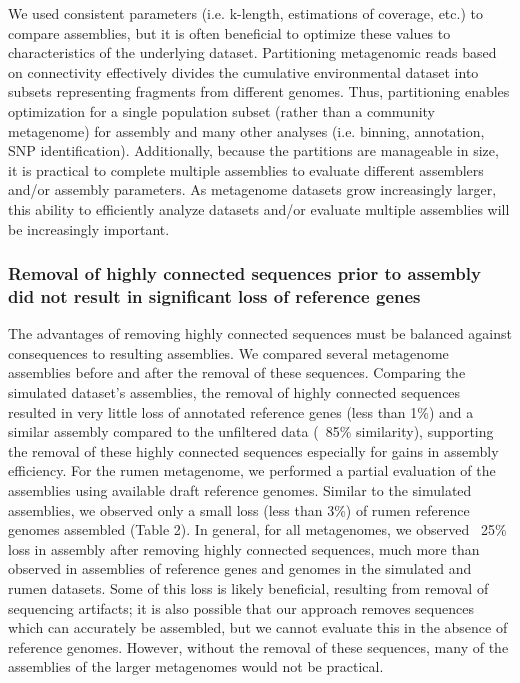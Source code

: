 \documentclass[10pt]{article}
\begin{document}
We used consistent parameters (i.e. k-length, estimations of coverage,
etc.) to compare assemblies, but it is often beneficial to optimize
these values to characteristics of the underlying dataset.
Partitioning metagenomic reads based on connectivity effectively
divides the cumulative environmental dataset into subsets representing
fragments from different genomes.  Thus, partitioning enables
optimization for a single population subset (rather than a community
metagenome) for assembly and many other analyses (i.e. binning,
annotation, SNP identification).  Additionally, because the partitions
are manageable in size, it is practical to complete multiple
assemblies to evaluate different assemblers and/or assembly
parameters.  As metagenome datasets grow increasingly larger, this
ability to efficiently analyze datasets and/or evaluate multiple
assemblies will be increasingly important.

\subsubsection*{Removal of highly connected sequences prior to assembly did not result in significant loss of reference genes}
The advantages of removing highly connected sequences must be balanced
against consequences to resulting assemblies.  We compared several
metagenome assemblies before and after the removal of these sequences.
Comparing the simulated dataset's assemblies, the removal of highly
connected sequences resulted in very little loss of annotated
reference genes (less than 1\%) and a similar assembly compared to the
unfiltered data (~85\% similarity), supporting the removal of these
highly connected sequences especially for gains in assembly
efficiency.  For the rumen metagenome, we performed a partial
evaluation of the assemblies using available draft reference genomes.
Similar to the simulated assemblies, we observed only a small loss
(less than 3\%) of rumen reference genomes assembled (Table 2).  In
general, for all metagenomes, we observed ~25\% loss in assembly after
removing highly connected sequences, much more than observed in
assemblies of reference genes and genomes in the simulated and rumen
datasets.  Some of this loss is likely beneficial, resulting from
removal of sequencing artifacts; it is also possible that our approach
removes sequences which can accurately be assembled, but we cannot
evaluate this in the absence of reference genomes.
However, without the
removal of these sequences, many of the assemblies of the larger
metagenomes would not be practical.
\end{document}
